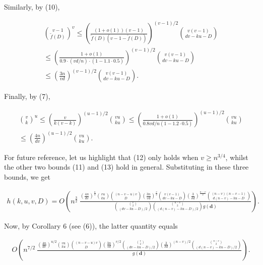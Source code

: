 \documentclass[10pt,a4paper]{article}
\begin{document}
Similarly, by (10),\par


\[\begin{gathered}
\displaystyle\binom{v-1}{\tilde{f}(D)}^{v} \displaystyle\leq \displaystyle\left(\frac{(1+o(1))(v-1)}{\tilde{f}(D)(v-1-\tilde{f}(D))}\right)^{(v-1)/2}\binom{v(v-1)}{dv-ku-D} \\
\displaystyle\leq \displaystyle\left(\frac{1+o(1)}{0.9\cdot(vd/n)\cdot(1-1.1\cdot 0.5)}\right)^{(v-1)/2}\binom{v(v-1)}{dv-ku-D} \\
\displaystyle\leq \displaystyle\left(\frac{3n}{vd}\right)^{(v-1)/2}\binom{v(v-1)}{dv-ku-D}.
\end{gathered}\]


Finally, by (7),\par


\[\begin{gathered}
\displaystyle\binom{v}{k}^{u} \displaystyle\leq \displaystyle\left(\frac{v}{k(v-k)}\right)^{(u-1)/2}\binom{vu}{ku}\leq\left(\frac{1+o(1)}{0.8vd/n(1-1.2\cdot 0.5)}\right)^{(u-1)/2}\binom{vu}{ku} \\
\displaystyle\leq \displaystyle\left(\frac{4n}{dv}\right)^{(u-1)/2}\binom{vu}{ku}.
\end{gathered}\]




For future reference, let us highlight that (12) only holds when $v\geq n^{3/4}$, whilst the other two bounds (11) and (13) hold in general. Substituting in these three bounds, we get\par


\[\begin{gathered}
h(k,u,v,D)=O\left(n^{\frac{3}{2}}\ \frac{\left(\frac{4n}{dv}\right)^{\frac{u}{2}}\binom{vu}{ku}{(n-v-u)v\choose D}\left(\frac{3n}{vd}\right)^{\frac{v}{2}}\binom{v(v-1)}{dv-ku-D}\left(\frac{3}{\delta d}\right)^{\frac{n-v}{2}}\binom{(n-v)(n-v-1)}{d(n-v)-ku-D}}{\binom{{v\choose 2}}{(dv-ku-D)/2}{{n-v\choose 2}\choose(d(n-v)-ku-D)/2}g(\mathbf{d})}\right).
\end{gathered}\]


Now, by Corollary 6 (see (6)), the latter quantity equals\par


\[\begin{gathered}
O\left(n^{7/2}\ \frac{\left(\frac{4n}{dv}\right)^{u/2}\binom{vu}{ku}{(n-v-u)v\choose D}\left(\frac{3n}{vd}\right)^{v/2}\binom{{v\choose 2}}{(dv-ku-D)/2}\left(\frac{3}{\delta d}\right)^{(n-v)/2}{{n-v\choose 2}\choose(d(n-v)-ku-D)/2}}{g(\mathbf{d})}\right).
\end{gathered}\]
\end{document}
